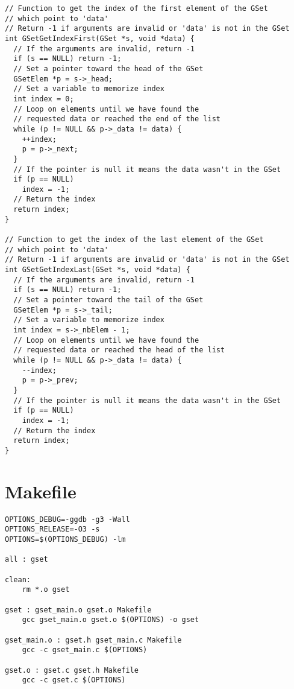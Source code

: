 \documentclass[12pt, a4paper]{article}
\begin{document}
\begin{scriptsize}
\begin{ttfamily}
\begin{lstlisting}
// Function to get the index of the first element of the GSet
// which point to 'data'
// Return -1 if arguments are invalid or 'data' is not in the GSet
int GSetGetIndexFirst(GSet *s, void *data) {
  // If the arguments are invalid, return -1
  if (s == NULL) return -1;
  // Set a pointer toward the head of the GSet
  GSetElem *p = s->_head;
  // Set a variable to memorize index
  int index = 0;
  // Loop on elements until we have found the 
  // requested data or reached the end of the list
  while (p != NULL && p->_data != data) {
    ++index;
    p = p->_next;
  }
  // If the pointer is null it means the data wasn't in the GSet
  if (p == NULL)
    index = -1;
  // Return the index
  return index;
}

// Function to get the index of the last element of the GSet
// which point to 'data'
// Return -1 if arguments are invalid or 'data' is not in the GSet
int GSetGetIndexLast(GSet *s, void *data) {
  // If the arguments are invalid, return -1
  if (s == NULL) return -1;
  // Set a pointer toward the tail of the GSet
  GSetElem *p = s->_tail;
  // Set a variable to memorize index
  int index = s->_nbElem - 1;
  // Loop on elements until we have found the 
  // requested data or reached the head of the list
  while (p != NULL && p->_data != data) {
    --index;
    p = p->_prev;
  }
  // If the pointer is null it means the data wasn't in the GSet
  if (p == NULL)
    index = -1;
  // Return the index
  return index;
}
\end{lstlisting}
\end{ttfamily}
\end{scriptsize}

\section{Makefile}

\begin{scriptsize}
\begin{ttfamily}
\begin{lstlisting}
OPTIONS_DEBUG=-ggdb -g3 -Wall
OPTIONS_RELEASE=-O3 -s 
OPTIONS=$(OPTIONS_DEBUG) -lm

all : gset

clean:
	rm *.o gset
	
gset : gset_main.o gset.o Makefile
	gcc gset_main.o gset.o $(OPTIONS) -o gset 

gset_main.o : gset.h gset_main.c Makefile
	gcc -c gset_main.c $(OPTIONS)

gset.o : gset.c gset.h Makefile
	gcc -c gset.c $(OPTIONS)
\end{lstlisting}
\end{ttfamily}
\end{scriptsize}
\end{document}
